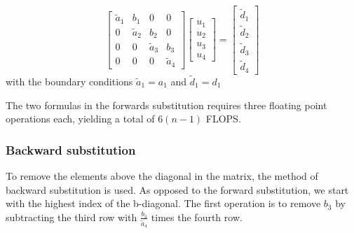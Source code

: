 \documentclass[12pt]{article}
\begin{document}
\begin{equation}
\begin{bmatrix}
                           \tilde{a}_{1}&b_{1}&0&0\\
                           0&\tilde{a}_{2}&b_{2}&0\\
                           0&0&\tilde{a}_{3}&b_{3}\\
                           0&0&0&\tilde{a}_{4}
                      \end{bmatrix}
                      \begin{bmatrix}
                           u_{1} \\
                           u_{2}\\
                           u_{3}\\
                           u_{4}
                      \end{bmatrix}
                      =
                      \begin{bmatrix}
                           \tilde{d}_{1} \\
                           \tilde{d}_{2}\\
                           \tilde{d}_{3}\\
                           \tilde{d}_{4}
                      \end{bmatrix}
\end{equation}
with the boundary conditions $\tilde{a}_{1}=a_{1}$ and $\tilde{d}_{1}=d_{1}$

The two formulas in the forwards substitution requires three floating point operations each, yielding a total of $6(n-1)$ FLOPS.
\subsubsection{Backward substitution}
To remove the elements above the diagonal in the matrix, the method of backward substitution is used. As opposed to the forward substitution, we start with the highest index of the b-diagonal. The first operation is to remove $b_{3}$ by subtracting the third row with $\frac{b_{3}}{\tilde{a}_{4}}$ times the fourth row. 
\end{document}
